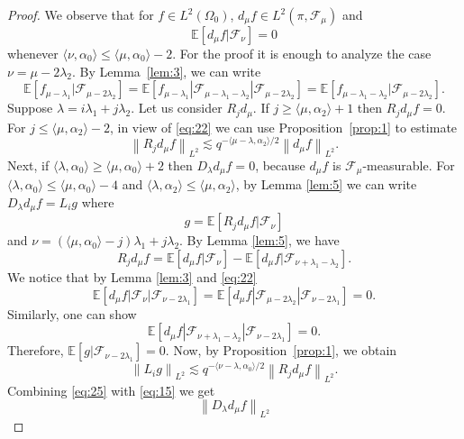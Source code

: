 \documentclass[a4paper]{amsart}
\newcommand{\sprod}[2]{{\langle #1, #2\rangle}}
\newcommand{\norm}[1]{{\left\lVert #1 \right\rVert}}
\newcommand{\EE}{\mathbb{E}}
\newcommand{\calF}{\mathcal{F}}
\theoremstyle{plain}
\theoremstyle{definition}
\theoremstyle{remark}
\numberwithin{equation}{section}
\theoremstyle{plain}
\begin{document}
\begin{proof}
	We observe that for $f \in L^2(\Omega_0)$, $d_\mu f \in L^2(\pi, \mathcal{F}_\mu)$ and 
	\begin{equation}
		\label{eq:22}
		\EE[d_\mu f| \mathcal{F}_{\nu}]=0
	\end{equation}
	whenever $\sprod{\nu}{\alpha_0} \leq \sprod{\mu}{\alpha_0} - 2$. For the proof it is enough to
	analyze the case $\nu = \mu - 2 \lambda_2$. By Lemma~\ref{lem:3}, we can write
	$$
	\EE[f_{\mu-\lambda_1} | \mathcal{F}_{\mu - 2 \lambda_2}] 
	= \EE[f_{\mu-\lambda_1} | \mathcal{F}_{\mu-\lambda_1-\lambda_2} 
	|\mathcal{F}_{\mu-2\lambda_2}] = \EE[f_{\mu-\lambda_1-\lambda_2} 
	| \mathcal{F}_{\mu-2\lambda_2}].
	$$
	Suppose $\lambda = i \lambda_1 + j \lambda_2$. Let us consider $R_j d_\mu$. 
	If $j \geq \sprod{\mu}{\alpha_2} + 1$ then $R_j d_\mu f = 0$. For $j \leq \sprod{\mu}{\alpha_2} - 2$,
	in view of \eqref{eq:22} we can use Proposition~\ref{prop:1} to estimate
	\begin{equation}
		\label{eq:15}
		\norm{R_j d_\mu f}_{L^2} \lesssim q^{-\sprod{\mu - \lambda}{\alpha_2}/2} \norm{d_\mu f}_{L^2}.
	\end{equation}
	Next, if $\sprod{\lambda}{\alpha_0} \geq \sprod{\mu}{\alpha_0} + 2$ then $D_\lambda d_\mu f = 0$, because
	$d_\mu f$ is $\calF_\mu$-measurable. For $\sprod{\lambda}{\alpha_0} \leq \sprod{\mu}{\alpha_0} - 4$ and
	$\sprod{\lambda}{\alpha_2} \leq \sprod{\mu}{\alpha_2}$, by Lemma \ref{lem:5} we can write
	$D_\lambda d_\mu f = L_i g$ where 
	$$
	g = \EE[R_j d_\mu f | \mathcal{F}_{\nu}]
	$$
	and $\nu = (\sprod{\mu}{\alpha_0} - j)\lambda_1 + j \lambda_2$. By Lemma \ref{lem:5}, we have
	\[
		R_j d_\mu f = \EE[d_\mu f | \calF_\nu] - \EE[d_\mu f | \calF_{\nu+\lambda_1-\lambda_2}].
	\]
	We notice that by Lemma \ref{lem:3} and \eqref{eq:22}
	$$
	\EE[d_\mu f | \mathcal{F}_{\nu} | \mathcal{F}_{\nu - 2 \lambda_1}] = 
	\EE[d_\mu f | \mathcal{F}_{\mu - 2\lambda_2} | \mathcal{F}_{\nu - 2 \lambda_1}] = 0.
	$$
	Similarly, one can show 
	$$
	\EE[d_\mu f | \mathcal{F}_{\nu + \lambda_1 - \lambda_2} | \mathcal{F}_{\nu - 2\lambda_1}] = 0.
	$$
	Therefore, $\EE[g | \mathcal{F}_{\nu - 2\lambda_1}] = 0$. Now, by Proposition~\ref{prop:1},
	we obtain
	\begin{equation}
		\label{eq:25}
		\norm{L_i g}_{L^2} \lesssim q^{-\sprod{\nu-\lambda}{\alpha_0}/2} \norm{R_j d_\mu f}_{L^2}.
	\end{equation}
	Combining \eqref{eq:25} with \eqref{eq:15} we get
	\begin{equation}
		\label{eq:16}
		\norm{D_\lambda d_\mu f}_{L^2} 

\end{equation}
\end{proof}
\end{document}
